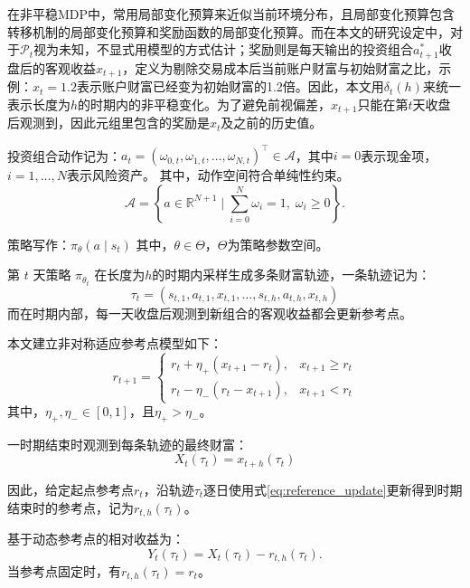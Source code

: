 \documentclass{sufethesismas}
\begin{document}
在非平稳MDP中，常用局部变化预算来近似当前环境分布，且局部变化预算包含转移机制的局部变化预算和奖励函数的局部变化预算\citep{feng2023nonstationary}。而在本文的研究设定中，对于$\mathcal{P}_t$视为未知，不显式用模型的方式估计；奖励则是每天输出的投资组合$a_{t+1}^*$收盘后的客观收益$x_{t+1}$，定义为剔除交易成本后当前账户财富与初始财富之比，示例：$x_t=1.2$表示账户财富已经变为初始财富的1.2倍。因此，本文用$\delta_t(h)$来统一表示长度为$h$的时期内的非平稳变化。为了避免前视偏差，$x_{t+1}$只能在第$t$天收盘后观测到，因此元组里包含的奖励是$x_{t}$及之前的历史值。

投资组合动作记为：$a_t=(\omega_{0,t},\omega_{1,t},\ldots,\omega_{N,t})^\top\in \mathcal{A}$，其中$i=0$表示现金项，$i=1,\dots,N$表示风险资产。
其中，动作空间符合单纯性约束。
\begin{equation*}
\mathcal{A}=\left\{a\in \mathbb{R}^{N+1} \mid \sum_{i=0}^N \omega_i=1,\; \omega_i\ge 0\right\}.
\end{equation*}

策略写作：$\pi_\theta(a\mid s_t)$
其中，$\theta\in\Theta$，$\Theta$为策略参数空间。

第 $t$ 天策略 $\pi_{\theta_t}$ 在长度为$h$的时期内采样生成多条财富轨迹，一条轨迹记为：
\begin{equation*}
\tau_t=(s_{t,1},a_{t,1},x_{t,1},\ldots,s_{t,h},a_{t,h},x_{t,h})
\end{equation*}
而在时期内部，每一天收盘后观测到新组合的客观收益都会更新参考点。

本文建立非对称适应参考点模型如下：
\begin{equation}
\label{eq:reference_update}
r_{t+1}
=
\begin{cases}
r_t+\eta_+\left(x_{t+1}-r_t\right), & x_{t+1}\ge r_t\\[4pt]
r_t-\eta_-\left(r_t-x_{t+1}\right), & x_{t+1}<r_t
\end{cases}
\end{equation}
其中，$\eta_+,\eta_-\in[0,1]$，且$\eta_+ >\eta_-$。

一时期结束时观测到每条轨迹的最终财富：
\begin{equation}
X_t(\tau_t)=x_{t+h}(\tau_t)
\end{equation}

因此，给定起点参考点$r_t$，沿轨迹$\tau_t$逐日使用式\eqref{eq:reference_update}更新得到时期结束时的参考点，记为$r_{t,h}(\tau_t)$。

基于动态参考点的相对收益为：
\begin{equation}
Y_t(\tau_t)=X_t(\tau_t)-r_{t,h}(\tau_t).
\end{equation}
当参考点固定时，有$r_{t,h}(\tau_t)=r_t$。
\end{document}
